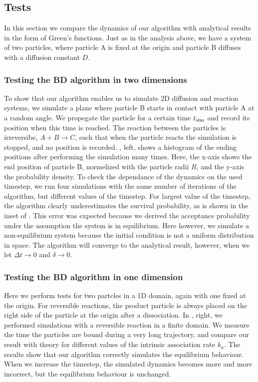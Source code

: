 \subsection{Tests}
In this section we compare the dynamics of our algorithm with analytical results in the form of Green's functions. Just as in the analysis above, we have a system of two particles, where particle A is fixed at the origin and particle B diffuses with a diffusion constant $D$. 

\subsubsection{Testing the BD algorithm in two dimensions}
To show that our algorithm enables us to simulate 2D diffusion and reaction systems, we simulate a plane where particle B starts in contact with particle A at a random angle. We propegate the particle for a certain time $t_{\rm sim}$ and record its position when this time is reached. The reaction between the particles is irreversibe, $A + B \to C$, such that when the particle reacts the simulation is stopped, and no position is recorded. , left, shows a histogram of the ending positions after performing the simulation many times. Here, the x-axis shows the end position of particle B, normelized with the particle radii $R$, and the y-axis the probability density. To check the dependance of the dynamics on the used timestep, we run four simulations with the same number of iterations of the algorithm, but different values of the timestep. For largest value of the timestep, the algorithm clearly underestimates the survival probability, as is shown in the inset of . This error was expected because we derived the acceptance probability under the assumption the system is in equilibrium. Here however, we simulate a non-equilibrium system because the initial condition is not a uniform distribution in space. The algorithm will converge to the analytical result, however, when we let $\Delta t \to 0$ and $\delta \to 0$.

\subsubsection{Testing the BD algorithm in one dimension}
Here we perform tests for two partcles in a 1D domain, again with one fixed at the origin. For reversible reactions, the product particle is always placed on the right side of the particle at the origin after a dissociation. In , right, we performed simulations with a reversible reaction in a finite domain. We measure the time the particles are bound during a very long trajectory, and compare our result with theory for different values of the intrinsic association rate $k_a$. The results show that our algorithm correctly simulates the equilibrium behaviour. When we increase the timestep, the simulated dynamics becomes more and more incorrect, but the equilibrium behaviour is unchanged.

